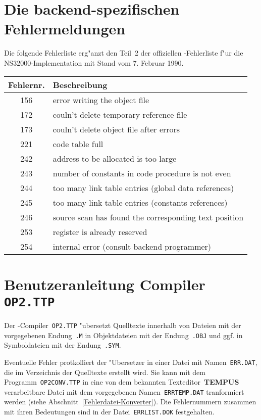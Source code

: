\newpage
\appendix

\section{Die backend-spezifischen Fehlermeldungen}

Die folgende Fehlerliste erg"anzt den Teil~2 der offiziellen
\oberon-Fehlerliste f"ur die NS32000-Implementation mit Stand vom 7. Februar 1990.

\medskip
\begin{tabular}{c|l}
Fehlernr.& Beschreibung\\ \hline
     156 & error writing the object file\\
     172 & couln't delete temporary reference file\\
     173 & couln't delete object file after errors\\
     221 & code table full\\
     242 & address to be allocated is too large\\
     243 & number of constants in code procedure is not even\\
     244 & too many link table entries (global data references)\\
     245 & too many link table entries (constants references)\\
     246 & source scan has found the corresponding text position\\
     253 & register is already reserved\\
     254 & internal error (consult backend programmer)
\end{tabular}

\section{Benutzeranleitung Compiler {\tt OP2.TTP}}
\label{Compileranleitung}

Der \oberon-Compiler~{\tt OP2.TTP} "ubersetzt Quelltexte innerhalb von
Dateien mit der vorgegebenen Endung~{\tt .M} in Objektdateien mit der
Endung~{\tt .OBJ} und ggf. in Symboldateien mit der Endung~{\tt .SYM}.

Eventuelle Fehler protkolliert der "Ubersetzer in einer Datei mit
Namen~{\tt ERR.DAT}, die im Verzeichnis der Quelltexte erstellt wird.
Sie kann mit dem Programm~{\tt OP2CONV.TTP} in eine von dem bekannten
Texteditor~{\bf TEMPUS} verarbeitbare Datei mit dem vorgegebenen
Namen~{\tt ERRTEMP.DAT} tranformiert werden (siehe Abschnitt~\ref{Fehlerdatei-Konverter}).
Die Fehlernummern zusammen mit ihren Bedeutungen sind in der
Datei~{\tt ERRLIST.DOK} festgehalten.

